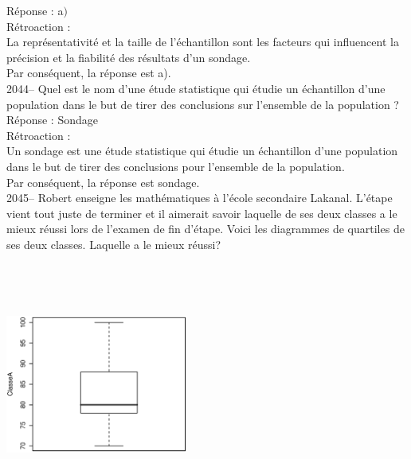 \documentclass[letterpaper, 12pt]{article}
\begin{document}
R\'eponse : a$)$\\

R\'etroaction :\\
La repr\'esentativit\'e et la taille de l'\'echantillon sont les facteurs qui influencent la pr\'ecision et la fiabilit\'e des r\'esultats d'un sondage.\\
Par cons\'equent, la r\'eponse est a).\\


2044-- Quel est le nom d'une \'etude statistique qui \'etudie un \'echantillon d'une population dans le but de tirer des conclusions sur l'ensemble de la population ? \\


R\'eponse : Sondage\\

R\'etroaction :\\
Un sondage est une \'etude statistique qui \'etudie un \'echantillon d'une population dans le but de tirer des conclusions pour l'ensemble de la population.\\
Par cons\'equent, la r\'eponse est sondage.\\

2045-- Robert enseigne les math\'ematiques \`a l'\'ecole secondaire Lakanal. L'\'etape vient tout juste de terminer et il aimerait savoir laquelle de ses deux classes a le mieux r\'eussi lors de l'examen de fin d'\'etape. Voici les diagrammes de quartiles de ses deux classes. Laquelle a le mieux r\'eussi?
\begin{center}
 \includegraphics[width=6cm,height=8cm,angle=-90]{G2045A.eps}
\end{center}
\end{document}
